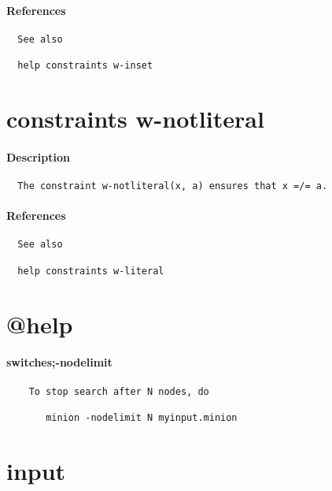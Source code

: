 \paragraph{References}
{\footnotesize
\begin{verbatim}
  See also

  help constraints w-inset
\end{verbatim}
}
\section{constraints w-notliteral}
\paragraph{Description}
{\footnotesize
\begin{verbatim}
  The constraint w-notliteral(x, a) ensures that x =/= a.
\end{verbatim}
}
\paragraph{References}
{\footnotesize
\begin{verbatim}
  See also

  help constraints w-literal
\end{verbatim}
}
\section{@help}
\paragraph{switches;-nodelimit}
{\footnotesize
\begin{verbatim}
    To stop search after N nodes, do

       minion -nodelimit N myinput.minion
\end{verbatim}
}
\section{input}
